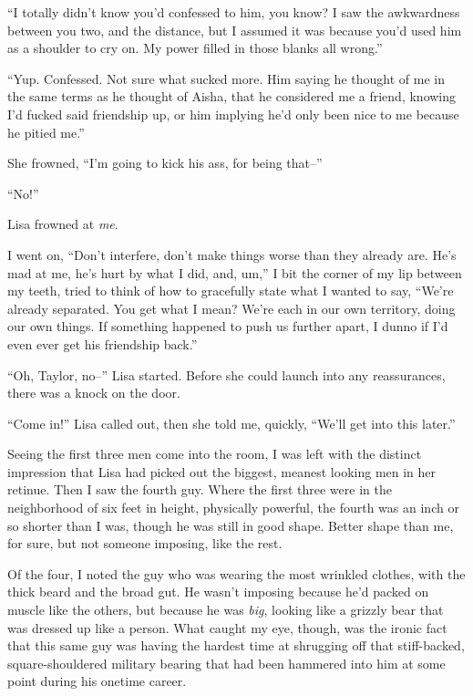 ``I totally didn't know you'd confessed to him, you know?  I saw the awkwardness between you two, and the distance, but I assumed it was because you'd used him as a shoulder to cry on.  My power filled in those blanks all wrong.''



``Yup.  Confessed.  Not sure what sucked more.  Him saying he thought of me in the same terms as he thought of Aisha, that he considered me a friend, knowing I'd fucked said friendship up, or him implying he'd only been nice to me because he pitied me.''



She frowned, ``I'm going to kick his ass, for being that--''



``No!''



Lisa frowned at \emph{me}.



I went on, ``Don't interfere, don't make things worse than they already are.  He's mad at me, he's hurt by what I did, and, um,'' I bit the corner of my lip between my teeth, tried to think of how to gracefully state what I wanted to say, ``We're already separated.  You get what I mean?  We're each in our own territory, doing our own things.  If something happened to push us further apart, I dunno if I'd even ever get his friendship back.''



``Oh, Taylor, no--'' Lisa started.  Before she could launch into any reassurances, there was a knock on the door.



``Come in!'' Lisa called out, then she told me, quickly, ``We'll get into this later.''



Seeing the first three men come into the room, I was left with the distinct impression that Lisa had picked out the biggest, meanest looking men in her retinue.  Then I saw the fourth guy.  Where the first three were in the neighborhood of six feet in height, physically powerful, the fourth was an inch or so shorter than I was, though he was still in good shape.  Better shape than me, for sure, but not someone imposing, like the rest.



Of the four, I noted the guy who was wearing the most wrinkled clothes, with the thick beard and the broad gut.  He wasn't imposing because he'd packed on muscle like the others, but because he was \emph{big}, looking like a grizzly bear that was dressed up like a person.  What caught my eye, though, was the ironic fact that this same guy was having the hardest time at shrugging off that stiff-backed, square-shouldered military bearing that had been hammered into him at some point during his onetime career.



